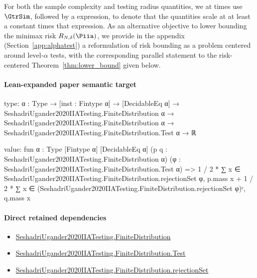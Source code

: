 \documentclass[10pt]{article}
\begin{document}
\begin{ReviewVerbatim}
	For both the sample complexity and testing radius quantities, we at times use $\GtrSim$, followed by a expression, to denote that the quantities scale at at least a constant times that expression. As an alternative objective to lower bounding the minimax risk $R_{N,\delta}(\Piia)$, we provide in the appendix (Section~\ref{app:alphatest}) a reformulation of risk bounding as a problem centered around level-$\alpha$ tests, with the corresponding parallel statement to the risk-centered Theorem~\ref{thm:lower_bound} given below.
\end{ReviewVerbatim}



\paragraph{Lean-expanded paper semantic target}
\begin{ReviewVerbatim}
type:
{α : Type} →
  [inst : Fintype α] →
    [DecidableEq α] →
      SeshadriUgander2020IIATesting.FiniteDistribution α →
        SeshadriUgander2020IIATesting.FiniteDistribution α → SeshadriUgander2020IIATesting.FiniteDistribution.Test α → ℝ

value:
fun {α : Type} [Fintype α] [DecidableEq α] (p q : SeshadriUgander2020IIATesting.FiniteDistribution α)
    (φ : SeshadriUgander2020IIATesting.FiniteDistribution.Test α) =>
  1 / 2 * ∑ x ∈ SeshadriUgander2020IIATesting.FiniteDistribution.rejectionSet φ, p.mass x +
    1 / 2 * ∑ x ∈ (SeshadriUgander2020IIATesting.FiniteDistribution.rejectionSet φ)ᶜ, q.mass x
\end{ReviewVerbatim}

\paragraph{Direct retained dependencies}
\begin{itemize}\raggedright
\item \hyperlink{governing-declaration-1f578dbb9f9dd733}{Seshadri\allowbreak{}Ugander2020\allowbreak{}IIA\allowbreak{}Testing.\allowbreak{}Finite\allowbreak{}Distribution}
\item \hyperlink{paper-prerequisite-1ae54af4030402fc}{Seshadri\allowbreak{}Ugander2020\allowbreak{}IIA\allowbreak{}Testing.\allowbreak{}Finite\allowbreak{}Distribution.\allowbreak{}Test}
\item \hyperlink{governing-declaration-16b22cb3f0375831}{Seshadri\allowbreak{}Ugander2020\allowbreak{}IIA\allowbreak{}Testing.\allowbreak{}Finite\allowbreak{}Distribution.\allowbreak{}rejection\allowbreak{}Set}
\end{itemize}
\end{document}
